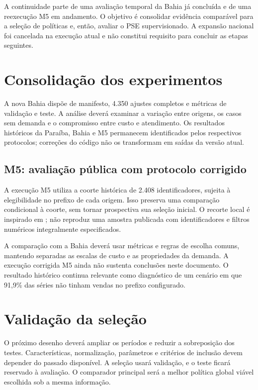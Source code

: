 
A continuidade parte de uma avaliação temporal da Bahia já concluída e de uma reexecução M5 em andamento. O objetivo é consolidar evidência comparável para a seleção de políticas e, então, avaliar o PSE supervisionado. A expansão nacional foi cancelada na execução atual e não constitui requisito para concluir as etapas seguintes.

\section{Consolidação dos experimentos}

A nova Bahia dispõe de manifesto, 4.350 ajustes completos e métricas de validação e teste. A análise deverá examinar a variação entre origens, os casos sem demanda e o compromisso entre custo e atendimento. Os resultados históricos da Paraíba, Bahia e M5 permanecem identificados pelos respectivos protocolos; correções do código não os transformam em saídas da versão atual.

\subsection{M5: avaliação pública com protocolo corrigido}
\label{sec:estudos_caso_adicionais}

A execução M5 utiliza a coorte histórica de 2.408 identificadores, sujeita à elegibilidade no prefixo de cada origem. Isso preserva uma comparação condicional à coorte, sem tornar prospectiva sua seleção inicial. O recorte local é inspirado em \citet{Zabraoui2025GaDQN}; não reproduz uma amostra publicada com identificadores e filtros numéricos integralmente especificados.

A comparação com a Bahia deverá usar métricas e regras de escolha comuns, mantendo separadas as escalas de custo e as propriedades da demanda. A execução corrigida M5 ainda não sustenta conclusões neste documento. O resultado histórico continua relevante como diagnóstico de um cenário em que 91,9\% das séries não tinham vendas no prefixo configurado.

\section{Validação da seleção}

O próximo desenho deverá ampliar os períodos e reduzir a sobreposição dos testes. Características, normalização, parâmetros e critérios de inclusão devem depender do passado disponível. A seleção usará validação, e o teste ficará reservado à avaliação. O comparador principal será a melhor política global viável escolhida sob a mesma informação.

